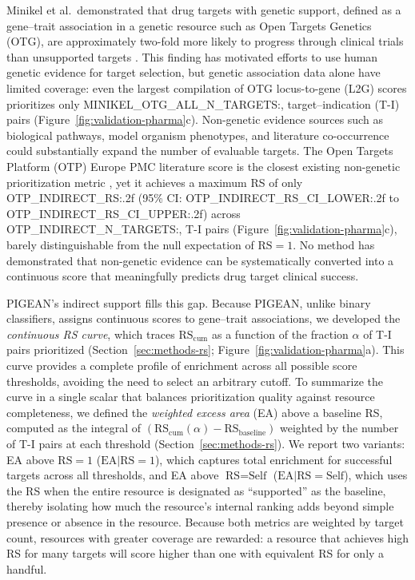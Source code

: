 Minikel et al.\ demonstrated that drug targets with genetic support, defined as a gene--trait association in a genetic resource such as Open Targets Genetics (OTG), are approximately two-fold more likely to progress through clinical trials than unsupported targets \cite{minikel_refining_2024}. This finding has motivated efforts to use human genetic evidence for target selection, but genetic association data alone have limited coverage: even the largest compilation of OTG locus-to-gene (L2G) scores prioritizes only {{MINIKEL_OTG_ALL_N_TARGETS:,}} target--indication (T-I) pairs (Figure~\ref{fig:validation-pharma}c). Non-genetic evidence sources such as biological pathways, model organism phenotypes, and literature co-occurrence could substantially expand the number of evaluable targets. The Open Targets Platform (OTP) Europe PMC literature score is the closest existing non-genetic prioritization metric \cite{buniello_open_2025}, yet it achieves a maximum RS of only {{OTP_INDIRECT_RS:.2f}} (95\% CI: {{OTP_INDIRECT_RS_CI_LOWER:.2f}} to {{OTP_INDIRECT_RS_CI_UPPER:.2f}}) across {{OTP_INDIRECT_N_TARGETS:,}} T-I pairs (Figure~\ref{fig:validation-pharma}c), barely distinguishable from the null expectation of $\text{RS} = 1$. No method has demonstrated that non-genetic evidence can be systematically converted into a continuous score that meaningfully predicts drug target clinical success.


PIGEAN's indirect support fills this gap. Because PIGEAN, unlike binary classifiers, assigns continuous scores to gene--trait associations, we developed the \textit{continuous RS curve}, which traces $\text{RS}_{\text{cum}}$ as a function of the fraction $\alpha$ of T-I pairs prioritized (Section~\ref{sec:methods-rs}; Figure~\ref{fig:validation-pharma}a). This curve provides a complete profile of enrichment across all possible score thresholds, avoiding the need to select an arbitrary cutoff. To summarize the curve in a single scalar that balances prioritization quality against resource completeness, we defined the \textit{weighted excess area} (EA) above a baseline RS, computed as the integral of $(\text{RS}_{\text{cum}}(\alpha) - \text{RS}_{\text{baseline}})$ weighted by the number of T-I pairs at each threshold (Section~\ref{sec:methods-rs}). We report two variants: EA above $\text{RS} = 1$ ($\text{EA}|\text{RS}{=}1$), which captures total enrichment for successful targets across all thresholds, and EA above $\text{RS} = \text{Self}$ ($\text{EA}|\text{RS}{=}\text{Self}$), which uses the RS when the entire resource is designated as ``supported'' as the baseline, thereby isolating how much the resource's internal ranking adds beyond simple presence or absence in the resource. Because both metrics are weighted by target count, resources with greater coverage are rewarded: a resource that achieves high RS for many targets will score higher than one with equivalent RS for only a handful.

